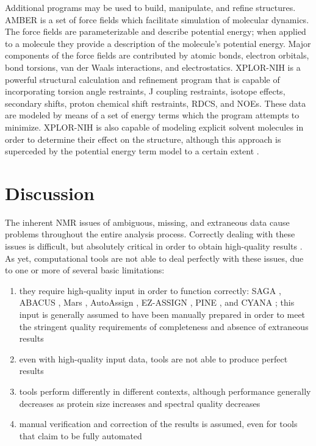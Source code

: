 Additional programs may be used to build, manipulate, and refine structures.
AMBER \cite{amber} is a set 
of force fields which facilitate simulation of molecular dynamics.  The
force fields are parameterizable and describe potential energy; when applied
to a molecule they provide a description of the molecule's potential energy. 
Major components of the force fields are contributed by atomic bonds, 
electron orbitals, bond torsions, van der Waals interactions, and electrostatics.
XPLOR-NIH \cite{xplor-nih} is a
powerful structural calculation and refinement program that is capable of
incorporating torsion angle restraints, J coupling restraints, isotope 
effects, \nmrisoc{} secondary shifts, proton chemical shift restraints, RDCS, and NOEs.
These data are modeled by means of a set of energy terms which the program
attempts to minimize.  XPLOR-NIH is also capable of modeling explicit 
solvent molecules in order to determine their effect on the structure, 
although this approach is superceded by the potential energy term model
to a certain extent \cite{xplor-nih}.



\section{Discussion}

The inherent NMR issues of ambiguous, missing, and extraneous data cause 
problems throughout the entire analysis process.  Correctly dealing with 
these issues is difficult, but absolutely critical in order to obtain 
high-quality results \cite{williamson2009automated, guntert2009automated, 
altieri2004automation, baran2004automated}.  As yet, computational tools 
are not able to deal perfectly with these issues, due to one or more of 
several basic limitations: 
\begin{enumerate}
  \item they require high-quality input in order to function correctly:
    SAGA \cite{saga}, ABACUS \cite{abacus_assignment}, Mars \cite{mars}, 
    AutoAssign \cite{autoassign2001}, EZ-ASSIGN \cite{ezassign},
    PINE \cite{pine}, and CYANA \cite{cyana2004};
  this input is generally assumed to have been manually prepared in order 
  to meet the stringent quality requirements of completeness and absence of 
  extraneous results
  \item even with high-quality input data, tools are not able to produce 
  perfect results 
  \item tools perform differently in different contexts, although 
  performance generally decreases as protein size increases and spectral quality 
  decreases
  \item manual verification and correction of the results is assumed, 
  even for tools that claim to be fully automated 
  \cite{williamson2009automated, guntert2009automated, altieri2004automation,
  baran2004automated}
\end{enumerate}

